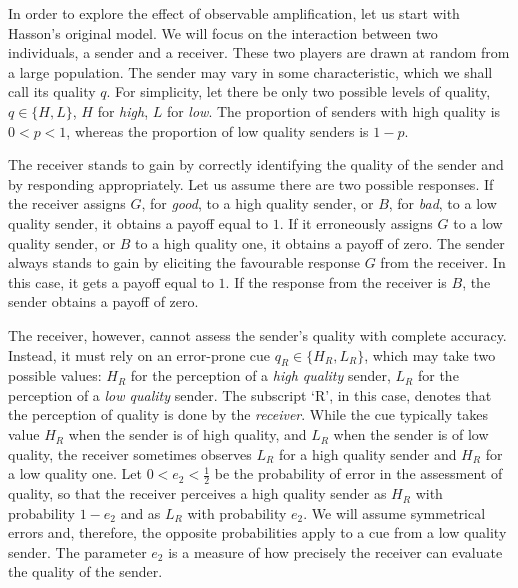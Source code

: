 \documentclass[a4paper,12pt]{article}
\numberwithin{equation}{section}
\begin{document}
In order to explore the effect of observable amplification, let us start with Hasson's original model. We will focus on the interaction between two individuals, a sender and a receiver. These two players are drawn at random from a large population. The sender may vary in some characteristic, which we shall call its quality $q$. For simplicity, let there be only two possible levels of quality, $q\in\{H, L\}$, $H$ for \textit{high}, $L$ for \textit{low}. The proportion of senders with high quality is $0<p<1$, whereas the proportion of low quality senders is $1-p$.

The receiver stands to gain by correctly identifying the quality of the sender and by responding appropriately. Let us assume there are two possible responses. If the receiver assigns $G$, for \textit{good}, to a high quality sender, or $B$, for \textit{bad}, to a low quality sender, it obtains a payoff equal to $1$. If it erroneously assigns $G$ to a low quality sender, or $B$ to a high quality one, it obtains a payoff of zero. The sender always stands to gain by eliciting the favourable response $G$ from the receiver. In this case, it gets a payoff equal to $1$. If the response from the receiver is $B$, the sender obtains a payoff of zero.

The receiver, however, cannot assess the sender's quality with complete accuracy. Instead, it must rely on an error-prone cue $q_{R} \in \{H_{R}, L_{R}\}$, which may take two possible values: $H_{R}$ for the perception of a \textit{high quality} sender, $L_{R}$ for the perception of a \textit{low quality} sender. The subscript `R', in this case, denotes that the perception of quality is done by the \textit{receiver}. While the cue typically takes value $H_{R}$ when the sender is of high quality, and $L_{R}$ when the sender is of low quality, the receiver sometimes observes $L_{R}$ for a high quality sender and $H_{R}$ for a low quality one. Let $0<e_{2}<\frac{1}{2}$ be the probability of error in the assessment of quality, so that the receiver perceives a high quality sender as $H_{R}$ with probability $1-e_{2}$ and as $L_{R}$ with probability $e_{2}$. We will assume symmetrical errors and, therefore, the opposite probabilities apply to a cue from a low quality sender. The parameter $e_{2}$ is a measure of how precisely the receiver can evaluate the quality of the sender.
\end{document}
